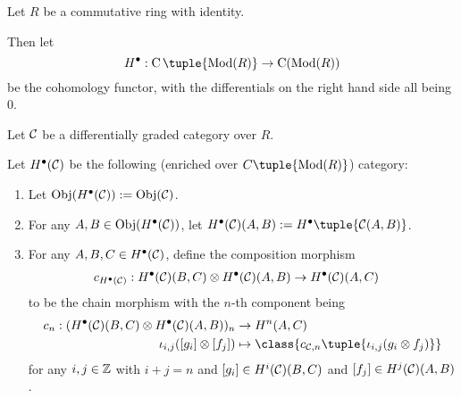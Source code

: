 \begin{notation}
    Let \( R \) be a commutative ring with identity.

    Then let
    \[
        H^\bullet: \C\tuple{\Mod(R)} \to \C(\Mod(R))
    \]
    be the cohomology functor, with the differentials on the right hand side all being \( 0 \).
\end{notation}

\begin{definition}[\( H^\bullet(\Cc) \)]
    \label{def:H_bullet_dg_category}
    Let \( {\mathcal{C}} \) be a differentially graded category over  \( R \).

    Let \( H^\bullet(\Cc) \) be the following (enriched over \( C\tuple{\Mod(R)} \)) category:
    \begin{enumerate}
        \item Let \( \operatorname{Obj}(H^\bullet({\mathcal{C}})) := \operatorname{Obj}({\mathcal{C}}) \).
        \item For any \( A, B \in \operatorname{Obj}(H^\bullet({\mathcal{C}})) \), let \( H^\bullet(\Cc)(A, B) := H^\bullet \tuple{\Cc(A, B)} \).
        \item {
            For any \( A, B, C \in H^\bullet({\mathcal{C}}) \), define the composition morphism
            \begin{align*}
                c_{H^\bullet({\mathcal{C}})}: H^\bullet({\mathcal{C}})(B, C) \otimes H^\bullet({\mathcal{C}})(A, B) &\to H^\bullet({\mathcal{C}})(A, C)
            \end{align*}
            to be the chain morphism with the \( n \)-th component being
            \begin{align*}
                c_n: (H^\bullet(\Cc)(B, C) \otimes H^\bullet(\Cc)(A, B))_n &\to H^n(A, C) \\
                \iota_{i, j}([g_i] \otimes [f_j]) &\mapsto \class{c_{\Cc,n}\tuple{\iota_{i, j}(g_i \otimes f_j)}}
            \end{align*}
            for any \( i, j \in {\mathbb{Z}} \) with \( i + j = n \) and \( [g_i] \in H^i({\mathcal{C}})(B, C) \) and \( [f_j] \in H^j({\mathcal{C}})(A, B) \).
        }
    \end{enumerate}
\end{definition}
